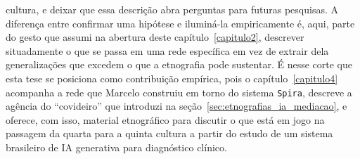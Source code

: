 cultura, e deixar que essa descrição abra perguntas para futuras pesquisas. A diferença entre confirmar uma hipótese e iluminá-la empiricamente é, aqui, parte do gesto que assumi na abertura deste capítulo~\ref{capitulo2}, descrever situadamente o que se passa em uma rede específica em vez de extrair dela generalizações que excedem o que a etnografia pode sustentar. É nesse corte que esta tese se posiciona como contribuição empírica, pois o capítulo~\ref{capitulo4} acompanha a rede que Marcelo construiu em torno do sistema \texttt{Spira}, descreve a agência do \enquote{covideiro} que introduzi na seção~\ref{sec:etnografias_ia_mediacao}, e oferece, com isso, material etnográfico para discutir o que está em jogo na passagem da quarta para a quinta cultura a partir do estudo de um sistema brasileiro de IA generativa para diagnóstico clínico.


